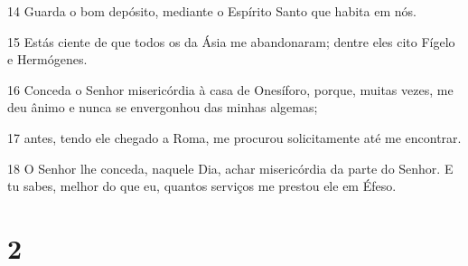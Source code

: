 \par 14 Guarda o bom depósito, mediante o Espírito Santo que habita em nós.
\par 15 Estás ciente de que todos os da Ásia me abandonaram; dentre eles cito Fígelo e Hermógenes.
\par 16 Conceda o Senhor misericórdia à casa de Onesíforo, porque, muitas vezes, me deu ânimo e nunca se envergonhou das minhas algemas;
\par 17 antes, tendo ele chegado a Roma, me procurou solicitamente até me encontrar.
\par 18 O Senhor lhe conceda, naquele Dia, achar misericórdia da parte do Senhor. E tu sabes, melhor do que eu, quantos serviços me prestou ele em Éfeso.

\chapter{2}

